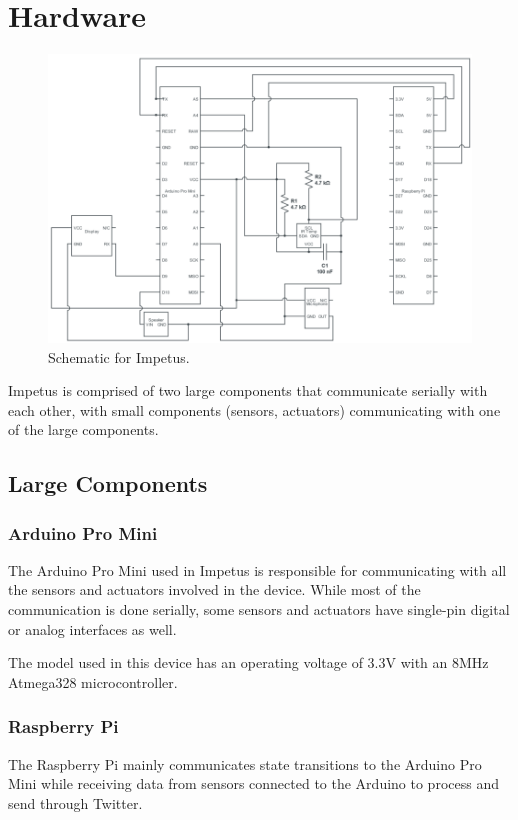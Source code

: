 \chapter{Hardware}

\begin{figure}[h!]
  \centering \includegraphics[width=1\textwidth]{schem}
  \caption{Schematic for Impetus.}
\end{figure}

Impetus is comprised of two large components that communicate serially
with each other, with small components (sensors, actuators)
communicating with one of the large components.

\section{Large Components}
\subsection{Arduino Pro Mini}
The Arduino Pro Mini used in Impetus is responsible for communicating
with all the sensors and actuators involved in the device. While most
of the communication is done serially, some sensors and actuators have
single-pin digital or analog interfaces as well.

The model used in this device has an operating voltage of 3.3V with an
8MHz Atmega328 microcontroller.

\subsection{Raspberry Pi}
The Raspberry Pi mainly communicates state transitions to the Arduino
Pro Mini while receiving data from sensors connected to the Arduino to
process and send through Twitter.


